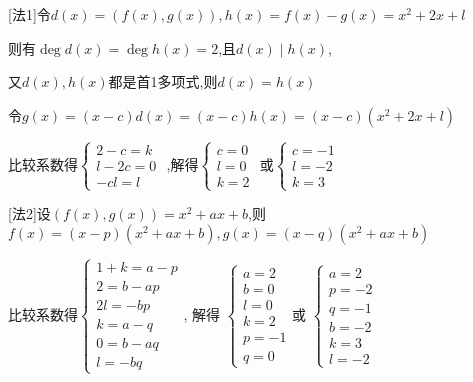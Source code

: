 \begin{solution}
    
    [法1]令$d(x)=(f(x),g(x)),h(x)=f(x)-g(x)=x^2+2x+l$

    则有$\deg d(x)=\deg h(x)=2$,且$d(x)\mid h(x)$,

    又$d(x),h(x)$都是首1多项式,则$d(x)=h(x)$

    令$g(x)=(x-c)d(x)=(x-c)h(x)=(x-c)(x^2+2x+l)$

    比较系数得$\begin{cases}
        2-c=k \\ 
        l-2c=0 \\ 
        -cl=l 
    \end{cases}$
    ,解得$\begin{cases}
        c=0 \\ 
        l=0 \\ 
        k=2
    \end{cases}$
    或$\begin{cases}
        c=-1 \\ 
        l=-2 \\ 
        k=3
    \end{cases}$

    [法2]设$(f(x),g(x))=x^2+ax+b$,则$f(x)=(x-p)(x^2+ax+b),g(x)=(x-q)(x^2+ax+b)$

    比较系数得$\begin{cases}
        1+k = a-p \\ 
        2 = b-ap \\ 
        2l = -bp \\ 
        k = a-q \\ 
        0 = b-aq \\ 
        l = -bq 
    \end{cases}$,
    解得
    $\begin{cases}
        a=2 \\
        b=0 \\ 
        l=0 \\ 
        k=2 \\ 
        p=-1 \\ 
        q=0
    \end{cases}$或
    $\begin{cases}
        a=2 \\
        p=-2 \\
        q=-1 \\ 
        b=-2 \\ 
        k=3 \\ 
        l=-2
    \end{cases}$
\end{solution}

